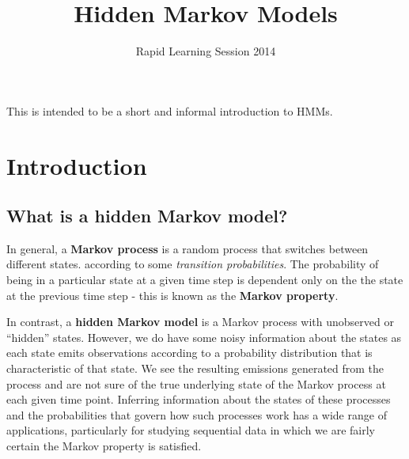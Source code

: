 \documentclass[11pt, oneside]{article}
\title{Hidden Markov Models}
\author{Rapid Learning Session 2014}
\date{}
\begin{document}
\maketitle

This is intended to be a short and informal introduction to HMMs.

\section{Introduction}
\subsection{What is a hidden Markov model?}
In general, a \textbf{Markov process} is a random process that switches between different states.
according to some \textit{transition probabilities}. The probability of being in a particular state at a given time step is dependent only on the the state at the previous time step - this is known as the \textbf{Markov property}. %


In contrast, a \textbf{hidden Markov model} is a Markov process with unobserved or ``hidden'' states. However, we do have some noisy information about the states as each state emits observations according to a probability distribution that is characteristic of that state. We see the resulting emissions generated from the process and are not sure of the true underlying state of the Markov process at each given time point. Inferring information about the states of these processes and the probabilities that govern how such processes work has a wide range of applications, particularly for studying sequential data in which we are fairly certain the Markov property is satisfied.
\end{document}
